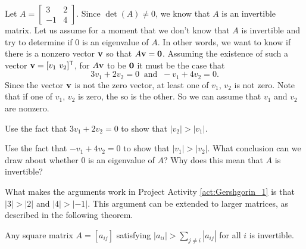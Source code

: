 \begin{pactivity} \label{act:Gershgorin_1} Let $A = \left[ \begin{array}{rc} 3&2 \\ -1&4 \end{array} \right]$. Since $\det(A) \neq 0$, we know that $A$ is an invertible matrix. Let us assume for a moment that we don't know that $A$ is invertible and try to determine if 0 is an eigenvalue of $A$. In other words, we want to know if there is a nonzero vector $\mathbf{v}$ so that $A \mathbf{v} = \mathbf{0}$. Assuming the existence of such a vector $\mathbf{v} = [v_1 \ v_2]^{\mathsf{T}}$, for $A \mathbf{v}$ to be $\mathbf{0}$ it must be the case that 
\[3v_1 + 2v_2 = 0\ \text{ and } \ -v_1 + 4v_2 = 0.\]
Since the vector $\mathbf{v}$ is not the zero vector, at least one of $v_1$, $v_2$ is not zero. Note that if one of $v_1$, $v_2$ is zero, the so is the other. So we can assume that $v_1$ and $v_2$ are nonzero. 
	\ba
	\item Use the fact that $3v_1+2v_2 = 0$ to show that $|v_2| >  |v_1|$. 


	\item  Use the fact that $-v_1 + 4v_2  = 0$ to show that $|v_1| >  |v_2|$. What conclusion can we draw about whether 0 is an eigenvalue of $A$? Why does this mean that $A$ is invertible?

	\ea
\end{pactivity}

What makes the arguments work in Project Activity \ref{act:Gershgorin_1} is that $|3| > |2|$ and $|4| > |-1|$. This argument can be extended to larger matrices, as described in the following theorem. 

\begin{theorem} Any square matrix $A = [a_{ij}]$ satisfying $|a_{ii}| > \sum_{j \neq i} |a_{ij}|$ for all $i$ is invertible. 
\end{theorem}

